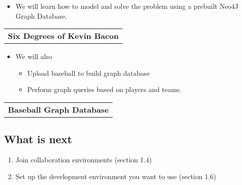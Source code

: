 \documentclass[11pt]{article}
\providecommand{\tightlist}{%
      \setlength{\itemsep}{0pt}\setlength{\parskip}{0pt}}
\begin{document}
    \begin{itemize}
\tightlist
\item
  We will learn how to model and solve the problem using a prebuilt
  Neo4J Graph Database.
\end{itemize}

\begin{longtable}[]{@{}c@{}}
\toprule
\tabularnewline
\midrule
\endhead
\textbf{Six Degrees of Kevin Bacon}\tabularnewline
\bottomrule
\end{longtable}

\begin{itemize}
\tightlist
\item
  We will also

  \begin{itemize}
  \tightlist
  \item
    Upload baseball to build graph database
  \item
    Perform graph queries based on players and teams.
  \end{itemize}
\end{itemize}

\begin{longtable}[]{@{}c@{}}
\toprule
\tabularnewline
\midrule
\endhead
\textbf{Baseball Graph Database}\tabularnewline
\bottomrule
\end{longtable}

    \subsection{What is next}\label{what-is-next}

\begin{enumerate}
\def\labelenumi{\arabic{enumi}.}
\tightlist
\item
  Join collaboration environments (section 1.4) 
\item
  Set up the development environment you want to use (section 1.6) 
\end{enumerate}


    
    
    
    
\end{document}
